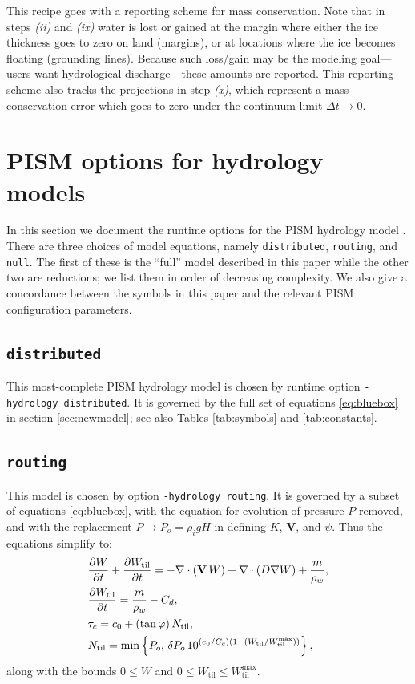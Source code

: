 \documentclass[gmd]{copernicus}   %
\newcommand{\text}{\textrm}
\newcommand\bV{\mathbf{V}}
\newcommand{\ddt}[1]{\ensuremath{\frac{\partial #1}{\partial t}}}
\newcommand{\Div}{\nabla\cdot}
\newcommand{\grad}{\nabla}
\newcommand{\Wtil}{W_{\text{til}}}
\newcommand{\Wtilmax}{W_{\text{til}}^{\text{max}}}
\begin{document}
\medskip
This recipe goes with a reporting scheme for mass conservation.  Note that in steps \emph{(ii)} and \emph{(ix)} water is lost or gained at the margin where either the ice thickness goes to zero on land (margins), or at locations where the ice becomes floating (grounding lines).  Because such loss/gain may be the modeling goal---users want hydrological discharge---these amounts are reported.  This reporting scheme also tracks the projections in step \emph{(x)}, which represent a mass conservation error which goes to zero under the continuum limit $\Delta t\to 0$.


\section{PISM options for hydrology models} \label{sec:pismdoc}

In this section we document the runtime options for the PISM hydrology model \citep{pism-user-manual}.  There are three choices of model equations, namely \texttt{distributed}, \texttt{routing}, and \texttt{null}.  The first of these is the ``full'' model described in this paper while the other two are reductions; we list them in order of decreasing complexity.  We also give a concordance between the symbols in this paper and the relevant PISM configuration parameters.

\subsection{\texttt{distributed}}  This most-complete PISM hydrology model is chosen by runtime option \texttt{-hydrology distributed}.  It is governed by the full set of equations \eqref{eq:bluebox} in section \ref{sec:newmodel}; see also Tables \ref{tab:symbols} and \ref{tab:constants}.

\subsection{\texttt{routing}}  This model is chosen by option \texttt{-hydrology routing}.  It is governed by a subset of equations \eqref{eq:bluebox}, with the equation for evolution of pressure $P$ removed, and with the replacement $P\mapsto P_o = \rho_i g H$ in defining $K$, $\bV$, and $\psi$.  Thus the equations simplify to:
\begin{align}
&\ddt{W} + \ddt{\Wtil} = - \Div\left(\bV\, W\right) + \Div \left(D \grad W\right) + \frac{m}{\rho_w}, \label{eq:routingmodel} \\
&\frac{\partial \Wtil}{\partial t} = \frac{m}{\rho_w} - C_d, \notag \\
&\tau_c = c_0 + (\tan \varphi)\, \Ntil, \notag \\
&\Ntil = \min\left\{P_o,\, \delta P_o \, 10^{(e_0/C_c) \left(1 - (\Wtil/\Wtilmax)\right)}\right\}, \notag
\end{align}
along with the bounds $0\le W$ and $0\le \Wtil \le \Wtilmax$.
\end{document}

